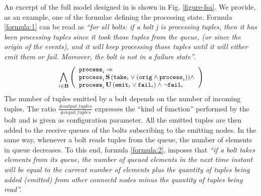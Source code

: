 \documentclass[smallextended]{svjour3}       %
\begin{document}
%	
%	
%	
%	
An excerpt of the full model designed in \cite{MBER16} is shown in Fig. \ref{figure-fsa}.
We provide, as an example, one of the formulae defining the processing state. Formula \ref{formula:1} can be read as \textit{``for all bolts: if a bolt j is processing tuples, then it has been processing tuples since it took those tuples from the queue, (or since the origin of the events), and it will keep processing those tuples until it will either emit them or fail. Moreover, the bolt is not in a failure state''.}
\begin{align}
\small
%
\bigwedge_{
	i \in \mathbf{B} } 
\left( 
\begin{array}{l}
\p{i} \Rightarrow \\
\p{i} \, \Snc \, ( \ta{i} \lor (\ori \land \p{i})) \land \\
\p{i} \, \U \, (\e{i} \lor \f{i}) \land \lnot \f{i} 
\end{array}
\right) \label{formula:1} 
%
\end{align}
The number of tuples emitted by a bolt depends on the number of incoming tuples. The ratio $\frac{\#output\_tuples}{\#input\_tuples}$ %
expresses the ``kind of function''  performed by the bolt and is given as configuration parameter. 
All the emitted tuples are then added to the receive queues of the bolts subscribing to the emitting nodes.
In the same way, whenever a bolt reads tuples from the queue, the number of elements in queue decreases. To this end, formula \ref{formula:2}, imposes that \textit{``if a bolt takes elements from its queue, the number of queued elements in the next time instant will be equal to the current number of elements plus the quantity of tuples being added (emitted) from other connectd nodes minus the quantity of tuples being read''.}
\end{document}

